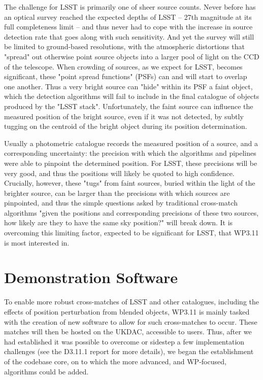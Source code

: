 \documentclass[a4paper,11pt]{scrartcl}
\begin{document}
The challenge for LSST is primarily one of sheer source counts.
Never before has an optical survey reached the expected depths of LSST -- 27th magnitude at its full completeness limit -- and thus never had to cope with the increase in source detection rate that goes along with such sensitivity.
And yet the survey will still be limited to ground-based resolutions, with the atmospheric distortions that "spread" out otherwise point source objects into a larger pool of light on the CCD of the telescope.
When crowding of sources, as we expect for LSST, becomes significant, these "point spread functions" (PSFs) can and will start to overlap one another.
Thus a very bright source can "hide" within its PSF a faint object, which the detection algorithms will fail to include in the final catalogue of objects produced by the "LSST stack".
Unfortunately, the faint source can influence the measured position of the bright source, even if it was not detected, by subtly tugging on the centroid of the bright object during its position determination.

Usually a photometric catalogue records the measured position of a source, and a corresponding uncertainty: the precision with which the algorithms and pipelines were able to pinpoint the determined position.
For LSST, these precisions will be very good, and thus the positions will likely be quoted to high confidence.
Crucially, however, these "tugs" from faint sources, buried within the light of the brighter source, can be larger than the precisions with which sources are pinpointed, and thus the simple questions asked by traditional cross-match algorithms "given the positions and corresponding precisions of these two sources, how likely are they to have the same sky position?" will break down.
It is overcoming this limiting factor, expected to be significant for LSST, that WP3.11 is most interested in.

\section{Demonstration Software}
To enable more robust cross-matches of LSST and other catalogues, including the effects of position perturbation from blended objects, WP3.11 is mainly tasked with the creation of new software to allow for such cross-matches to occur.
These matches will then be hosted on the UKDAC, accessible to users.
Thus, after we had established it was possible to overcome or sidestep a few implementation challenges (see the D3.11.1 report for more details), we began the establishment of the codebase core, on to which the more advanced, and WP-focused, algorithms could be added.
\end{document}
